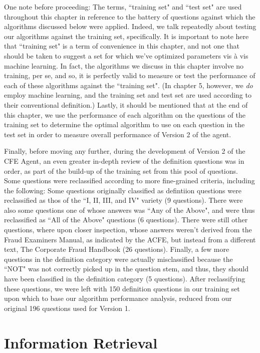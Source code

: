 One note before proceeding:  The terms, ``training set" and ``test set" are used throughout this chapter in reference to the battery of questions against which the algorithms discussed below were applied.  Indeed, we talk repeatedly about testing our algorithms against the training set, specifically. It is important to note here that ``training set" is a term of convenience in this chapter, and not one that should be taken to suggest a set for which we've optimized parameters vis \`a vis machine learning.  In fact, the algorithms we discuss in this chapter involve no training, per se, and so, it is perfectly valid to measure or test the performance of each of these algorithms against the ``training set".   (In chapter 5, however, we \emph{do} employ machine learning, and the training set and test set are used according to their conventional definition.)  Lastly, it should be mentioned that at the end of this chapter, we use the performance of each algorithm on the questions of the training set to determine the optimal algorithm to use on each question in the test set in order to measure overall performance of Version 2 of the agent.

Finally, before moving any further, during the development of Version 2 of the CFE Agent, an even greater in-depth review of the definition questions was in order, as part of the build-up of the training set from this pool of questions.  Some questions were reclassified according to more fine-grained criteria, including the following:  Some questions originally classified as defintiion questions were reclassified as thos of the ``I, II, III, and IV" variety (9 questions).  There were also some questions one of whose answers was ``Any of the Above", and were thus reclassified as ``All of the Above" questions (6 questions).  There were still other questions, where upon closer inspection, whose answers weren't derived from the Fraud Examiners Manual, as indicated by the ACFE, but instead from a different text, The Corporate Fraud Handbook (26 questions).  Finally, a few more questions in the definition category were actually misclassified because the ``NOT" was not correctly picked up in the question stem, and thus, they should have been classified in the definition category (5 questions).  After reclassifying these questions, we were left with 150 definition questions in our training set upon which to base our algorithm performance analysis, reduced from our original 196 questions used for Version 1.


\section{Information Retrieval}

